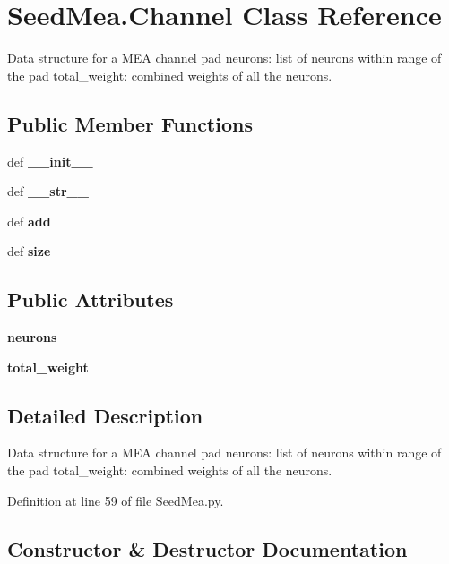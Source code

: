 \section{\-Seed\-Mea.\-Channel \-Class \-Reference}
\label{classSeedMea_1_1Channel}


\-Data structure for a \-M\-E\-A channel pad neurons\-: list of neurons within range of the pad total\-\_\-weight\-: combined weights of all the neurons.  


\subsection*{\-Public \-Member \-Functions}
\begin{DoxyCompactItemize}
\item 
def {\bf \-\_\-\-\_\-init\-\_\-\-\_\-}
\item 
def {\bf \-\_\-\-\_\-str\-\_\-\-\_\-}
\item 
def {\bf add}
\item 
def {\bf size}
\end{DoxyCompactItemize}
\subsection*{\-Public \-Attributes}
\begin{DoxyCompactItemize}
\item 
{\bf neurons}
\item 
{\bf total\-\_\-weight}
\end{DoxyCompactItemize}


\subsection{\-Detailed \-Description}
\-Data structure for a \-M\-E\-A channel pad neurons\-: list of neurons within range of the pad total\-\_\-weight\-: combined weights of all the neurons. 

\-Definition at line 59 of file \-Seed\-Mea.\-py.



\subsection{\-Constructor \& \-Destructor \-Documentation}
